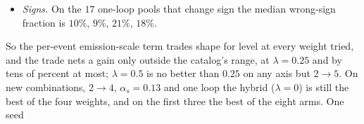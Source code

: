 \documentclass[11pt]{article}
\begin{document}
\begin{itemize}
    against the hybrid's $2.31$ and the emission scales' $2.88$ ($0.86$ of the hybrid's per probe, better on $26$ of
    the $40$); on the top $1.84$, between the hybrid's $1.94$ and the emission scales' $1.67$ (better than the hybrid
    on $130$ of the $237$); at $p_T\geq30$\,GeV $0.361$ against $0.366$. At $2\to5$ the level it buys is paid back in
    shape: $1.20$, $1.24$, $1.12$, $1.21$, though $0.90$ of the hybrid's per probe at $\lambda=0.25$ (better on $24$ of
    the $40$). None of the blends overtakes the best of the other arms there: the context vector's on $2\to5$ ($1.03$)
    and the top ($1.46$), $\hat s$ alone's at $1$ to $10$\,TeV ($1.73$) and $p_T\geq30$\,GeV ($0.341$).
  \item \emph{Signs.} On the $17$ one-loop pools that change sign the median wrong-sign fraction is $10\%$, $9\%$,
    $21\%$, $18\%$.
\end{itemize}
So the per-event emission-scale term trades shape for level at every weight tried, and the trade nets a gain only
outside the catalog's range, at $\lambda=0.25$ and by tens of percent at most; $\lambda=0.5$ is no better than
$0.25$ on any axis but $2\to5$. On new combinations, $2\to4$, $\alpha_s=0.13$ and one loop the hybrid ($\lambda=0$) is
still the best of the four weights, and on the first three the best of the eight arms. One seed
\end{document}
